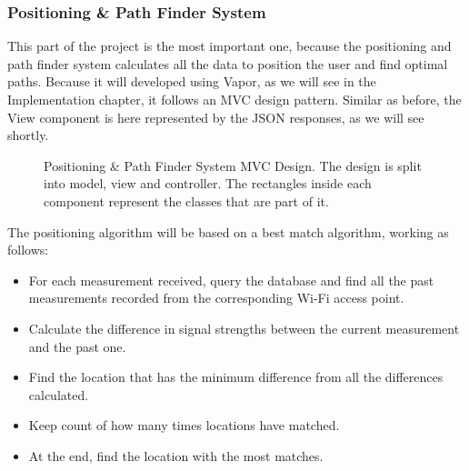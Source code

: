 \subsubsection{Positioning \& Path Finder System}
This part of the project is the most important one, because the positioning and path finder system calculates all the data to position the user and find optimal paths. Because it will developed using Vapor, as we will see in the Implementation chapter, it follows an MVC design pattern. Similar as before, the View component is here represented by the JSON responses, as we will see shortly.

\begin{figure}[H]
    \centering
    \centering
    \caption{Positioning \& Path Finder System MVC Design. The design is split into model, view and controller. The rectangles inside each component represent the classes that are part of it.}
    \label{fig:pos-nav-mvc}
\end{figure}

The positioning algorithm will be based on a best match algorithm, working as follows:
\begin{itemize}
    \item For each measurement received, query the database and find all the past measurements recorded from the corresponding Wi-Fi access point.
    \item Calculate the difference in signal strengths between the current measurement and the past one.
    \item Find the location that has the minimum difference from all the differences calculated.
    \item Keep count of how many times locations have matched.
    \item At the end, find the location with the most matches.
\end{itemize}


